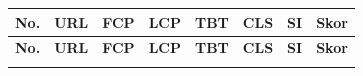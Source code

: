 \begingroup
\fontsize{9}{11}\selectfont
\begin{longtable}{|c|p{5cm}|c|c|c|c|c|c|}
      \hline
      \textbf{No.}                             & \textbf{URL}                                               & \textbf{FCP}     & \textbf{LCP}     & \textbf{TBT}     & \textbf{CLS}     & \textbf{SI}      & \textbf{Skor} \\
      \hline
      \endfirsthead

      \hline
      \textbf{No.}                             & \textbf{URL}                                               & \textbf{FCP}     & \textbf{LCP}     & \textbf{TBT}     & \textbf{CLS}     & \textbf{SI}      & \textbf{Skor} \\
      \hline
      \endhead

      \hline
      \endfoot

      \hline
      \endlastfoot


\end{longtable}
